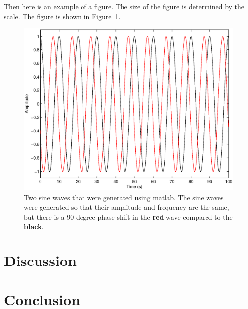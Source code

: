 Then here is an example of a figure. The size of the figure is determined by the scale. The figure is shown in Figure~\ref{fig:SineWaves}.

\begin{figure}[H]
	\centering
	\includegraphics[scale = 0.8]{Figures/Chapter01/Figure01.eps}
	\caption[An example figure]{Two sine waves that were generated using matlab. The sine waves were generated so that their amplitude and frequency are the same, but there is a 90 degree phase shift in the \textbf{red} wave compared to the \textbf{black}.}
	\label{fig:SineWaves}
\end{figure}	

\section{Discussion}

\section{Conclusion}


\renewcommand{\bibname}{References}
